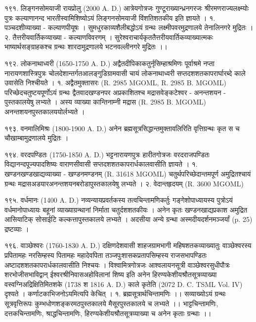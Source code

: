 १९१. लिङ्गनसोमयाजी रायप्रोलु (2000 A. D.)
आत्रेयगोत्रजः गुण्टूराख्यान्ध्रनगरजः श्रीरमणराज्यलक्ष्म्योः पुत्रः कल्याणानन्द भारतीस्वामिशिष्योऽयं लिङ्गनसोमयाजी विंशतिशतकीय इति ज्ञायते ।
१. पञ्चदशीव्याख्या - कल्याणपीयूषः । सुमधुरकाव्यशैलीबद्धोऽयं ग्रन्थः लक्ष्मीपवरमुद्रणालये तेनालिनगरे मुद्रितः ।
२. तैत्तरीयवार्तिकव्याख्या - कल्याणविवरणम् । सुरेश्वराचार्यकृततैत्तरीयवार्तिकव्याख्यात्मकः भाष्यार्थसङ्ग्राहकश्च ग्रन्थः शारदामुद्रणालये भटनवल्लीनगरे मुद्रितः ।।

१९२. लोकनाथाध्वरी (1650-1750 A. D.)
अद्वैतदीपिकाकतुर्नृसिम्हाश्रमिणः पूर्वाश्रमे नप्ता नारायणशास्त्रिपुत्रः चोलदेशान्तर्गतआलङ्गुडिग्रामवासी चायं लोकनाथाध्वरी सप्तदशशतकापरार्घारब्दे काले उवासेति निश्चीयते ।
१. अद्वैतमुक्तासरः (R. 2985 MGOML, R. 2985 B. MGOML)
परिच्छेदचतुष्टयपूर्णोऽयं ग्रन्थः द्वैतवादखण्डनपर अप्रकाशितश्च मद्रासवेङ्कटेश्वर - अनन्तशयन - पुस्तकालयेषु लभ्यते । अस्य व्याख्या कान्तिनाम्नी मद्रास (R. 2985 B. MGOML) अनन्तशयनपुस्तकालययोर्लभ्यते ।

१९३. वनमालिमिश्रः (1800-1900 A. D.)
अनेन ब्रह्मसूत्रसिद्धान्तमुक्तावलिरिति वृत्तिग्रन्थः कृत स च चौखाम्बामुद्रणालये मुद्रितः ।

१९४. वरदपण्डितः (1750-1850 A. D.)
भट्टनारायणपुत्रः हारीतगोत्रजः वरदराजपण्डितः विद्यानन्दपूज्यपादशिष्यः वाराणसीवासी सप्तदशशतकापरार्धकालवासीति ज्ञायते ।
१. खण्डनखण्डखाद्यव्याख्या - खण्डनमण्डनम् (R. 31618 MGOML) चतुर्थपरिच्छेदान्तमपूर्ण अमुद्रितश्चायं ग्रन्थः मद्रासअडयारअनन्तशयनबरोडापुस्तकालयेषु लभ्यते ।
२. वेदान्तहृदयम् (R. 3600 MGOML)

१९५. वर्धमानः (1400 A. D.)
नव्यन्यायप्रवर्तकस्य तत्वचिन्तामणिकर्तुः गङ्गेशोपाध्यायस्य पुत्रोऽयं वर्धमानोपाध्यायः बहूनां व्याख्याग्रन्थानां निर्माता चतुर्दशशतकीयः । अनेन कृतः खण्डनखाद्यप्रकाश अमुद्रित आसियाटिक् सोसाईटि कल्कत्तापुस्तकालये लभ्यते । अदसीया अन्ये ग्रन्था अस्मदीयदर्शनमञ्जर्यां (p. 25) द्रष्टव्याः ।

१९६. वाञ्छेश्वरः (1760-1830 A. D.)
दक्षिणदेशवासी शाहजग्रामभागी महिषशतकव्याख्यातुः वाञ्छेश्वरस्य प्रपितामहः नरसिम्हस्य पितामहः महादेवपिता तञ्जपुःशासकप्रतापसिम्हस्य राजसभापण्डितः अष्टादशशतकापरार्धकालवासीति निश्चयः । विश्वामित्रगोत्रजः आश्वलायनसूत्री वाञ्छेश्वरसुधीपौत्रः शरभोजीसभाविद्वान् ईश्वरश्रीनिवासअहोविलानां शिष्य इति अनेन हिरण्यकेशीयश्रौतसूत्रव्याख्या वस्वग्निअद्रिक्षितिमितशके (1738 श 1816 A. D.) काले कृतेति (2072 D. C. TSML Vol. IV) दृश्यते । कर्णाटकाभिजनोऽयमित्यपि केचित् ।
१. ब्रह्मसूत्रार्थचिन्तामणिः ।।
सव्याख्योऽयं ग्रन्थः सूत्रवृत्तिरूपः कुम्भधोणशङ्करमठपुस्तकालये मैसूरपुस्तकालये च लभ्यते ।।
भाट्टचिन्तामणिः, दत्तकचिन्तामणिः, श्राद्धचिन्तामणिः, हिरण्यकेशीयश्रौतसूत्रव्याख्या च अनेन कृताः ग्रन्थाः ।।


